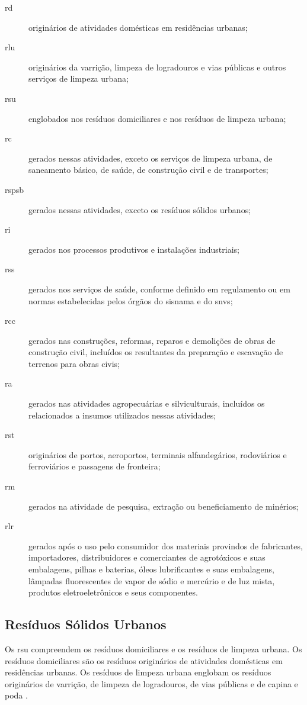 \begin{description}
	\item[\gls{rd}] originários de atividades domésticas em residências urbanas;
	\item[\gls{rlu}] originários da varrição, limpeza de logradouros e vias públicas e outros serviços de limpeza urbana;
	\item[\gls{rsu}] englobados nos resíduos domiciliares e nos resíduos de limpeza urbana;
	\item[\gls{rc}] gerados nessas atividades, exceto os serviços de limpeza urbana, de saneamento básico, de saúde, de construção civil e de transportes;
	\item[\gls{rspsb}] gerados nessas atividades, exceto os resíduos sólidos urbanos;
	\item[\gls{ri}] gerados nos processos produtivos e instalações industriais;
	\item[\gls{rss}] gerados nos serviços de saúde, conforme definido em regulamento ou em normas estabelecidas pelos órgãos do \gls{sisnama} e do \gls{snvs};
	\item[\gls{rcc}] gerados nas construções, reformas, reparos e demolições de obras de construção civil, incluídos os resultantes da preparação e escavação de terrenos para obras civis;
	\item[\gls{ra}] gerados nas atividades agropecuárias e silviculturais, incluídos os relacionados a insumos utilizados nessas atividades;
	\item[\gls{rst}] originários de portos, aeroportos, terminais alfandegários, rodoviários e ferroviários e passagens de fronteira;
	\item[\gls{rm}] gerados na atividade de pesquisa, extração ou beneficiamento de minérios;
	\item[\gls{rlr}] gerados após o uso pelo consumidor dos materiais provindos de fabricantes, importadores, distribuidores e comerciantes de agrotóxicos e suas embalagens, pilhas e baterias, óleos lubrificantes e suas embalagens, lâmpadas fluorescentes de vapor de sódio e mercúrio e de luz mista, produtos eletroeletrônicos e seus componentes.
	
\end{description}

\subsection{Resíduos Sólidos Urbanos}
Os \gls{rsu} compreendem os resíduos domiciliares e os resíduos de limpeza urbana. Os resíduos domiciliares são os resíduos originários de atividades domésticas em residências urbanas. Os resíduos de limpeza urbana englobam os resíduos originários de varrição, de limpeza de logradouros, de vias públicas e de capina e poda \cite{brasil:12305, brasil:11445}.

